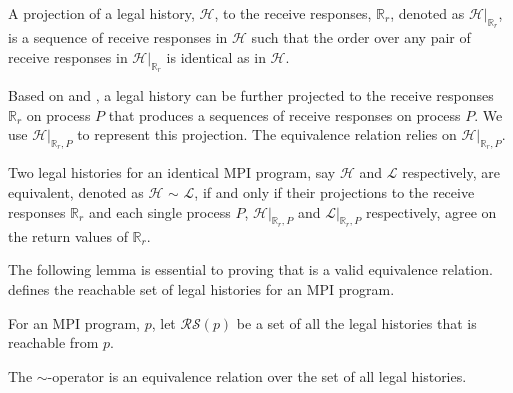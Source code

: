 \begin{definition}\label{def:projection_receive}
A projection of a legal history, $\mathcal{H}$, to the receive responses, $\mathbb{R}_r$, denoted as $\mathcal{H} | _{\mathbb{R}_r}$, is a sequence of receive responses in $\mathcal{H}$ such that the order over any pair of receive responses in $\mathcal{H} | _{\mathbb{R}_r}$ is identical as in $\mathcal{H}$.
\end{definition}

Based on  and , a legal history can be further projected to the receive responses $\mathbb{R}_r$ on process $P$ that produces a sequences of receive responses on process $P$. We use $\mathcal{H} | _{\mathbb{R}_r,P}$ to represent this projection. The equivalence relation relies on $\mathcal{H} | _{\mathbb{R}_r,P}$.

\begin{definition}\label{def:er}
Two legal histories for an identical MPI program, say $\mathcal{H}$ and $\mathcal{L}$ respectively, are equivalent, denoted as $\mathcal{H}$ $\sim$ $\mathcal{L}$, if and only if their projections to the receive responses $\mathbb{R}_r$ and each single process $P$, $\mathcal{H} | _{\mathbb{R}_r,P}$ and $\mathcal{L} | _{\mathbb{R}_r,P}$ respectively, agree on the return values of $\mathbb{R}_r$.
\end{definition}

The following lemma is essential to proving that  is a valid equivalence relation.  defines the reachable set of legal histories for an MPI program. 

\begin{definition}\label{def:reachable}
For an MPI program, $\mathit{p}$, let $\mathcal{RS}(\mathit{p})$ be a set of all the legal histories that is reachable from $\mathit{p}$.
\end{definition}

\begin{lemma}\label{lemma:rst}
The $\sim$-operator is an equivalence relation over the set of all legal histories.
\end{lemma}

